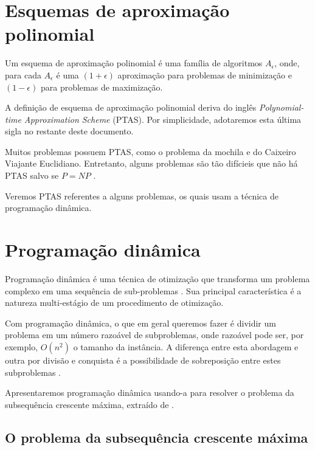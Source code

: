 \section{Esquemas de aproximação polinomial}
\label{sec:ptas}

\begin{definition}

Um esquema de aproximação polinomial é uma família de algoritmos ${A_\epsilon}$, onde, para cada $A_\epsilon$ é uma $(1 + \epsilon )$ aproximação para problemas de minimização e $(1 - \epsilon)$ para problemas de maximização.

\end{definition}

A definição de esquema de aproximação polinomial deriva do inglês \textit{Polynomial-time Approximation Scheme} (PTAS). Por simplicidade, adotaremos esta última sigla no restante deste documento.

Muitos problemas possuem PTAS, como o problema da mochila e do Caixeiro Viajante Euclidiano. Entretanto, alguns problemas são tão difícieis que não há PTAS salvo se $P=NP$ \cite{alimonti2000some}.

Veremos PTAS referentes a alguns problemas, os quais usam a técnica de programação dinâmica.

\section{Programação dinâmica}
\label{sec:programacaoDinamica}

Programação dinâmica é uma técnica de otimização que transforma um problema complexo em uma sequência de sub-problemas \cite{Bradley}. Sua principal característica é a natureza multi-estágio de um procedimento de otimização.

Com programação dinâmica, o que em geral queremos fazer é dividir um problema em um número razoável de subproblemas, onde razoável pode ser, por exemplo, $O(n^2)$ o tamanho da instância. A diferença entre esta abordagem e outra por divisão e conquista é a possibilidade de sobreposição entre estes subproblemas \cite{blum}.

Apresentaremos programação dinâmica usando-a para resolver o problema da subsequência crescente máxima, extraído de \cite{feofiloff}.

\subsection{O problema da subsequência crescente máxima}
\label{subsec:sscm}

